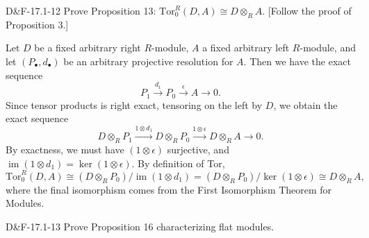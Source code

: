 \documentclass{article}
\newcommand{\tor}{\text{Tor}}
\begin{document}
	\begin{prb}{D\&F-17.1-12}
		Prove Proposition 13: $\tor_{0}^{R}(D,A) \cong D \otimes_{R} A$. [Follow the proof of Proposition 3.]
	\end{prb}
	
	Let $D$ be a fixed arbitrary right $R$-module, $A$ a fixed arbitrary left $R$-module, and let $(P_{\bullet}, d_{\bullet})$ be an arbitrary projective resolution for $A$. Then we have the exact sequence 
	\begin{equation*}
		P_{1} \xrightarrow{d_{1}} P_{0} \xrightarrow{\epsilon} A \to 0. 
	\end{equation*}
	Since tensor products is right exact, tensoring on the left by $D$, we obtain the exact sequence 
	\begin{equation*}
		D \otimes_{R} P_{1} \xrightarrow{1 \otimes d_{1}} D \otimes_{R} P_{0} \xrightarrow{1 \otimes \epsilon} D \otimes_{R} A \to 0. 
	\end{equation*}
	By exactness, we must have $(1 \otimes \epsilon)$ surjective, and $\operatorname{im}(1 \otimes d_{1}) = \ker(1 \otimes \epsilon)$. By definition of Tor, 
	\begin{equation*}
		\tor_{0}^{R}(D, A) \cong (D\otimes_{R} P_{0})/\operatorname{im}(1 \otimes d_{1}) = (D \otimes_{R} P_{0})/\ker(1 \otimes \epsilon) \cong D\otimes_{R}A, 
	\end{equation*}
	where the final isomorphism comes from the First Isomorphism Theorem for Modules. 
	
	\begin{prb}{D\&F-17.1-13}
		Prove Proposition 16 characterizing flat modules. 
	\end{prb}
	
\end{document}
